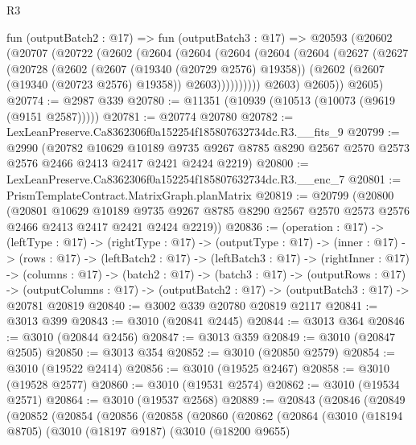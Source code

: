 \begin{lexlean}{R3}
\begin{coremodule}
  fun (outputBatch2 : @17) =>
  fun (outputBatch3 : @17) =>
  @20593
    (@20602
      (@20707
        (@20722
          (@2602
            (@2604
              (@2604
                (@2604
                  (@2604
                    (@2604
                      (@2627
                        (@2627
                          (@20728
                            (@2602
                              (@2607 (@19340 (@20729 @2576) @19358))
                              (@2602 (@2607 (@19340 (@20723 @2576) @19358)) @2603))))))))))
            @2603)
          @2605))
      @2605)
@20774 := @2987 @339
@20780 := @11351 (@10939 (@10513 (@10073 (@9619 (@9151 @2587)))))
@20781 := @20774 @20780
@20782 := LexLeanPreserve.Ca8362306f0a152254f185807632734dc.R3.__fits_9
@20799 := @2990
    (@20782
      @10629
      @10189
      @9735
      @9267
      @8785
      @8290
      @2567
      @2570
      @2573
      @2576
      @2466
      @2413
      @2417
      @2421
      @2424
      @2219)
@20800 := LexLeanPreserve.Ca8362306f0a152254f185807632734dc.R3.__enc_7
@20801 := PrismTemplateContract.MatrixGraph.planMatrix
@20819 := @20799
    (@20800
      (@20801
        @10629
        @10189
        @9735
        @9267
        @8785
        @8290
        @2567
        @2570
        @2573
        @2576
        @2466
        @2413
        @2417
        @2421
        @2424
        @2219))
@20836 := (operation : @17) ->
  (leftType : @17) ->
  (rightType : @17) ->
  (outputType : @17) ->
  (inner : @17) ->
  (rows : @17) ->
  (leftBatch2 : @17) ->
  (leftBatch3 : @17) ->
  (rightInner : @17) ->
  (columns : @17) ->
  (batch2 : @17) ->
  (batch3 : @17) ->
  (outputRows : @17) ->
  (outputColumns : @17) -> (outputBatch2 : @17) -> (outputBatch3 : @17) -> @20781 @20819
@20840 := @3002 @339 @20780 @20819 @2117
@20841 := @3013 @399
@20843 := @3010 (@20841 @2445)
@20844 := @3013 @364
@20846 := @3010 (@20844 @2456)
@20847 := @3013 @359
@20849 := @3010 (@20847 @2505)
@20850 := @3013 @354
@20852 := @3010 (@20850 @2579)
@20854 := @3010 (@19522 @2414)
@20856 := @3010 (@19525 @2467)
@20858 := @3010 (@19528 @2577)
@20860 := @3010 (@19531 @2574)
@20862 := @3010 (@19534 @2571)
@20864 := @3010 (@19537 @2568)
@20889 := @20843
    (@20846
      (@20849
        (@20852
          (@20854
            (@20856
              (@20858
                (@20860
                  (@20862
                    (@20864
                      (@3010
                        (@18194 @8705)
                        (@3010
                          (@18197 @9187)
                          (@3010
                            (@18200 @9655)

\end{coremodule}
\end{lexlean}
